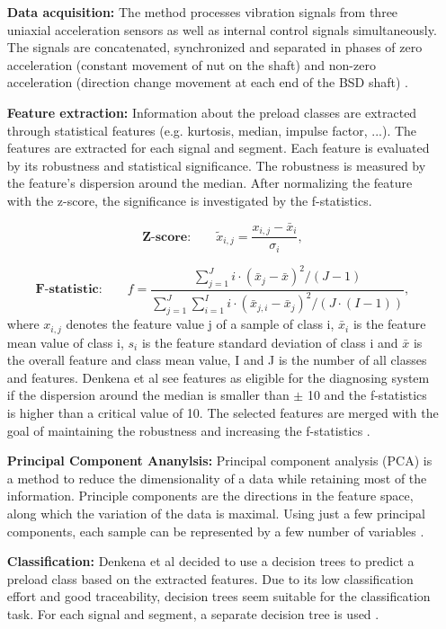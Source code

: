 \begin{itemize}
    \item [\textbf{Data acquisition:}] The method processes vibration signals from three uniaxial acceleration sensors as well as internal control signals simultaneously. The signals are concatenated, synchronized and separated in phases of zero acceleration (constant movement of nut on the shaft) and non-zero acceleration (direction change movement at each end of the BSD shaft)  \cite{Denkena2021}.
    \item [\textbf{Feature extraction:}] Information about the preload classes are extracted through statistical features (e.g. kurtosis, median, impulse factor, ...). The features are extracted for each signal and segment. Each feature is evaluated by its robustness and statistical significance. The robustness is measured by the feature's dispersion around the median. After normalizing the feature with the z-score, the significance is investigated by the f-statistics.
    
    \begin{equation}
        \textbf{Z-score:}\qquad \tilde{x}_{i,j} = \frac{x_{i,j} - \bar x_{i}}{\sigma_{i}},
    \end{equation}
    
    \begin{equation}
        \textbf{F-statistic:}\qquad f = \frac{\sum_{j=1}^{J} i \cdot (\bar x_{j} -\bar x)^{2}/(J-1)}{\sum_{j=1}^{J} \sum_{i=1}^{I} i \cdot (\bar x_{j,i} -\bar x_{j})^{2}/(J \cdot (I-1))},
    \end{equation}
    where ${x}_{i,j}$ denotes the feature value j of a sample of class i, $\bar{x}_{i}$ is the feature mean value of class i, ${s}_{i}$ is the feature standard deviation of class i and $\bar{x}$ is the overall feature and class mean value, I and J is the number of all classes and features. Denkena et al see features as eligible for the diagnosing system if the dispersion around the median is smaller than $\pm$ 10 and the f-statistics is higher than a critical value of 10. The selected features are merged with the goal of maintaining the robustness and increasing the f-statistics  \cite{Denkena2021}. 
    
    \item [\textbf{Principal Component Ananylsis:}] 
    Principal component analysis (PCA) is a method to reduce the dimensionality of a data while retaining most of the information. Principle components are the directions in the feature space, along which the variation of the data is maximal. Using just a few principal components, each sample can be represented by a few number of variables \cite{Ringner2008}.
    
    \item [\textbf{Classification:}] Denkena et al decided to use a decision trees to predict a preload class based on the extracted features. Due to its low classification effort and good traceability, decision trees seem suitable for the classification task. For each signal and segment, a separate decision tree is used  \cite{Denkena2021}. 
\end{itemize}



